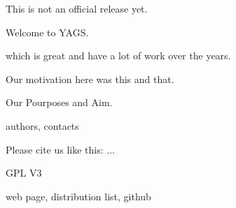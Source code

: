 

This is not an official release yet.


Welcome to YAGS.

which is great and have a lot of work over the years. 

Our motivation here was this and that.

Our Pourposes and Aim.

authors, contacts



 Please cite us like this: ... 



GPL V3 



web page, distribution list, github


